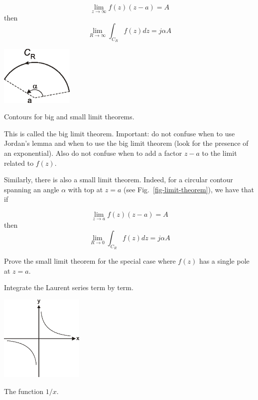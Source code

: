 \begin{equation}
\lim_{z \to \infty}  f(z) (z-a) = A
\end{equation}
then
\begin{equation}
\lim_{R \to \infty} \int_{{C}_R} f(z) dz = j \alpha A
\end{equation}

\begin{marginfigure}
\centering
\includegraphics[width=3.5cm]{complex/figures/limit_theorem}
\caption{Contours for big and small limit theorems.}
\label{fig-limit-theorem}
\end{marginfigure}

This is called the big limit theorem. Important: do not confuse when to use Jordan's lemma and when to use the big limit theorem (look for the presence of an exponential). Also do not confuse when to add a factor $z-a$ to the limit related to $f(z)$.

Similarly, there is also a small limit theorem. Indeed, for a circular contour spanning an angle $\alpha$ with top at $z=a$ (see Fig.~\ref{fig-limit-theorem}), we have that if

\begin{equation}
\lim_{z \to a}  f(z) (z-a) = A
\end{equation}
then
\begin{equation}
\lim_{R \to 0} \int_{{C}_R} f(z) dz = j \alpha A
\end{equation}

\begin{exer}
  Prove the small limit theorem for the special case where $f(z)$ has a single pole at $z=a$.
  \begin{hnt}
    Integrate the Laurent series term by term.
  \end{hnt}
\end{exer}

\pagebreak


\begin{marginfigure}
\centering
\includegraphics[width=4cm]{complex/figures/pv}
\caption{The function $1/x$.}
\label{fig-pv}
\end{marginfigure}


